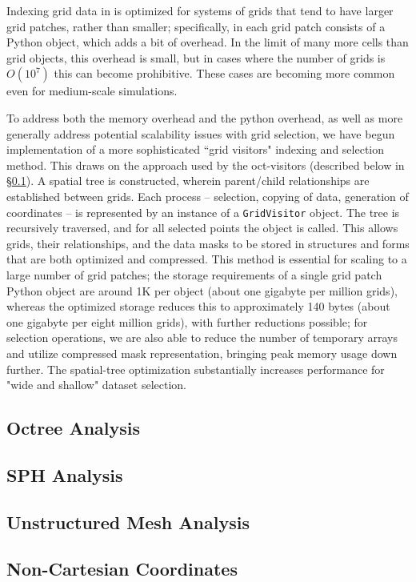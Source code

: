 Indexing grid data in \yt{} is optimized for systems of grids that tend to have
larger grid patches, rather than smaller; specifically, in \yt{} each grid
patch consists of a Python object, which adds a bit of overhead.  In the limit
of many more cells than grid objects, this overhead is small, but in cases
where the number of grids is $O(10^7)$ this can become prohibitive.  These
cases are becoming more common even for medium-scale simulations.

To address both the memory overhead and the python overhead, as well as more
generally address potential scalability issues with grid selection, we have
begun implementation of a more sophisticated ``grid visitors" indexing and
selection method.  This draws on the approach used by the oct-visitors
(described below in \S \ref{sec:octree_analysis}).  A spatial tree is
constructed, wherein parent/child relationships are established between grids.
Each process -- selection, copying of data, generation of coordinates -- is
represented by an instance of a \texttt{GridVisitor} object.  The tree is
recursively traversed, and for all selected points the object is called.  This
allows grids, their relationships, and the data masks to be stored in
structures and forms that are both optimized and compressed.  This method is
essential for scaling to a large number of grid patches; the storage
requirements of a single grid patch Python object are around 1K per object
(about one gigabyte per million grids), whereas the optimized storage reduces
this to approximately 140 bytes (about one gigabyte per eight million grids),
with further reductions possible; for selection operations, we are also able to
reduce the number of temporary arrays and utilize compressed mask
representation, bringing peak memory usage down further.  The spatial-tree
optimization substantially increases performance for "wide and shallow" dataset
selection.

\subsection{Octree Analysis}
\label{sec:octree_analysis}

\subsection{SPH Analysis}

\subsection{Unstructured Mesh Analysis}

\subsection{Non-Cartesian Coordinates}



